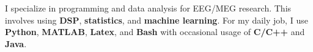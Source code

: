 \begin{cventries}
    \begin{flushleft}
        I specialize in programming and data analysis for EEG/MEG research. This involves using \textbf{DSP}, \textbf{statistics}, and \textbf{machine learning}.
        For my daily job, I use \textbf{Python}, \textbf{MATLAB}, \textbf{Latex}, and \textbf{Bash} with occasional usage of \textbf{C/C++} and \textbf{Java}.
    \end{flushleft}
\end{cventries}

